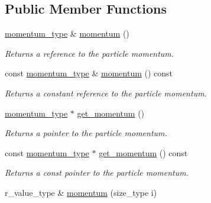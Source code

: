 \subsection*{Public Member Functions}
\begin{DoxyCompactItemize}
\item 
\hypertarget{a00026_a79fce0d9b6a930abadadf0821af97a10}{\hyperlink{a00559}{momentum\-\_\-type} \& \hyperlink{a00026_a79fce0d9b6a930abadadf0821af97a10}{momentum} ()}\label{a00026_a79fce0d9b6a930abadadf0821af97a10}

\begin{DoxyCompactList}\small\item\em Returns a reference to the particle momentum. \end{DoxyCompactList}\item 
\hypertarget{a00026_a1596ed0e9ea2b008e1a80848ff502031}{const \hyperlink{a00559}{momentum\-\_\-type} \& \hyperlink{a00026_a1596ed0e9ea2b008e1a80848ff502031}{momentum} () const }\label{a00026_a1596ed0e9ea2b008e1a80848ff502031}

\begin{DoxyCompactList}\small\item\em Returns a constant reference to the particle momentum. \end{DoxyCompactList}\item 
\hypertarget{a00026_a981db240e25874134f68b5ff29acd70f}{\hyperlink{a00559}{momentum\-\_\-type} $\ast$ \hyperlink{a00026_a981db240e25874134f68b5ff29acd70f}{get\-\_\-momentum} ()}\label{a00026_a981db240e25874134f68b5ff29acd70f}

\begin{DoxyCompactList}\small\item\em Returns a pointer to the particle momentum. \end{DoxyCompactList}\item 
\hypertarget{a00026_a3c45bdcb543f3465beb61a24b5d6adc7}{const \hyperlink{a00559}{momentum\-\_\-type} $\ast$ \hyperlink{a00026_a3c45bdcb543f3465beb61a24b5d6adc7}{get\-\_\-momentum} () const }\label{a00026_a3c45bdcb543f3465beb61a24b5d6adc7}

\begin{DoxyCompactList}\small\item\em Returns a const pointer to the particle momentum. \end{DoxyCompactList}\item 
\hypertarget{a00026_a0e6e8593189c78c16b413fd8ba892c20}{r\-\_\-value\-\_\-type \& \hyperlink{a00026_a0e6e8593189c78c16b413fd8ba892c20}{momentum} (size\-\_\-type i)}\label{a00026_a0e6e8593189c78c16b413fd8ba892c20}


\end{DoxyCompactItemize}
